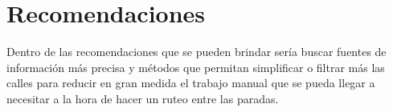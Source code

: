 \section{Recomendaciones}

Dentro de las recomendaciones que se pueden brindar sería buscar fuentes de información más precisa y métodos que permitan simplificar o filtrar más las calles para reducir en gran medida el trabajo manual que se pueda llegar a necesitar a la hora de hacer un ruteo entre las paradas.

\newpage 
